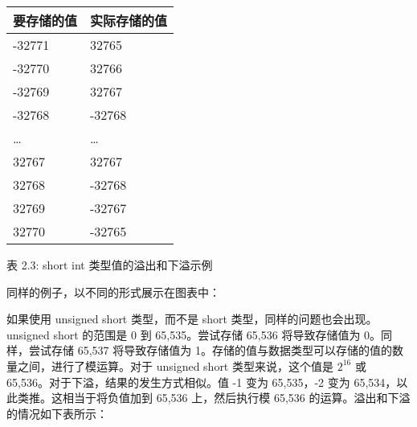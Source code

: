 \begin{longtable}{|l|l|}
\hline
\textbf{要存储的值} & \textbf{实际存储的值} \\ \hline
\endfirsthead
%
\endhead
%
-32771                  & 32765                 \\ \hline
-32770                  & 32766                 \\ \hline
-32769                  & 32767                 \\ \hline
-32768                  & -32768                \\ \hline
…                       & …                     \\ \hline
32767                   & 32767                 \\ \hline
32768                   & -32768                \\ \hline
32769                   & -32767                \\ \hline
32770                   & -32765                \\ \hline
\end{longtable}

\begin{center}
表 2.3: short int 类型值的溢出和下溢示例
\end{center}

同样的例子，以不同的形式展示在图表中：


如果使用 unsigned short 类型，而不是 short 类型，同样的问题也会出现。unsigned short 的范围是 0 到 65,535。尝试存储 65,536 将导致存储值为 0。同样，尝试存储 65,537 将导致存储值为 1。存储的值与数据类型可以存储的值的数量之间，进行了模运算。对于 unsigned short 类型来说，这个值是 $2^{16}$ 或 65,536。对于下溢，结果的发生方式相似。值 -1 变为 65,535，-2 变为 65,534，以此类推。这相当于将负值加到 65,536 上，然后执行模 65,536 的运算。溢出和下溢的情况如下表所示：

